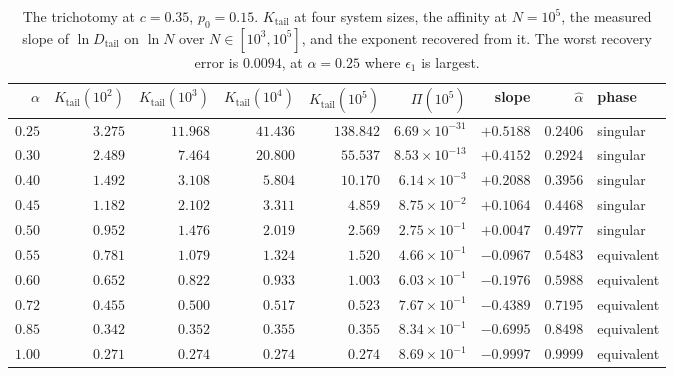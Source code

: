 \documentclass[11pt,reqno]{amsart}
\theoremstyle{plain}
\theoremstyle{definition}
\theoremstyle{remark}
\numberwithin{equation}{section}
\newcommand{\Kt}{K_{\mathrm{tail}}}
\newcommand{\Dt}{D_{\mathrm{tail}}}
\begin{document}
\begin{table}[ht]
\centering\footnotesize\setlength{\tabcolsep}{4.5pt}
\caption{The trichotomy at $c=0.35$, $p_0=0.15$. $\Kt$ at four system sizes, the affinity at $N=10^5$, the measured slope of $\ln\Dt$ on $\ln N$ over $N\in[10^3,10^5]$, and the exponent recovered from it. The worst recovery error is $0.0094$, at $\alpha=0.25$ where $\epsilon_1$ is largest.}
\label{tab:trichotomy}
\begin{tabular}{@{}r r r r r r r r l@{}}
\toprule
$\alpha$ & $\Kt(10^2)$ & $\Kt(10^3)$ & $\Kt(10^4)$ & $\Kt(10^5)$ & $\Pi(10^5)$ & slope & $\widehat\alpha$ & phase\\
\midrule
$0.25$ & $3.275$ & $11.968$ & $41.436$ & $138.842$ & $6.69 \times 10^{-31}$ & $+0.5188$ & $0.2406$ & singular\\
$0.30$ & $2.489$ & $7.464$ & $20.800$ & $55.537$ & $8.53 \times 10^{-13}$ & $+0.4152$ & $0.2924$ & singular\\
$0.40$ & $1.492$ & $3.108$ & $5.804$ & $10.170$ & $6.14 \times 10^{-3}$ & $+0.2088$ & $0.3956$ & singular\\
$0.45$ & $1.182$ & $2.102$ & $3.311$ & $4.859$ & $8.75 \times 10^{-2}$ & $+0.1064$ & $0.4468$ & singular\\
$0.50$ & $0.952$ & $1.476$ & $2.019$ & $2.569$ & $2.75 \times 10^{-1}$ & $+0.0047$ & $0.4977$ & singular\\
$0.55$ & $0.781$ & $1.079$ & $1.324$ & $1.520$ & $4.66 \times 10^{-1}$ & $-0.0967$ & $0.5483$ & equivalent\\
$0.60$ & $0.652$ & $0.822$ & $0.933$ & $1.003$ & $6.03 \times 10^{-1}$ & $-0.1976$ & $0.5988$ & equivalent\\
$0.72$ & $0.455$ & $0.500$ & $0.517$ & $0.523$ & $7.67 \times 10^{-1}$ & $-0.4389$ & $0.7195$ & equivalent\\
$0.85$ & $0.342$ & $0.352$ & $0.355$ & $0.355$ & $8.34 \times 10^{-1}$ & $-0.6995$ & $0.8498$ & equivalent\\
$1.00$ & $0.271$ & $0.274$ & $0.274$ & $0.274$ & $8.69 \times 10^{-1}$ & $-0.9997$ & $0.9999$ & equivalent\\
\bottomrule
\end{tabular}
\end{table}
\end{document}
